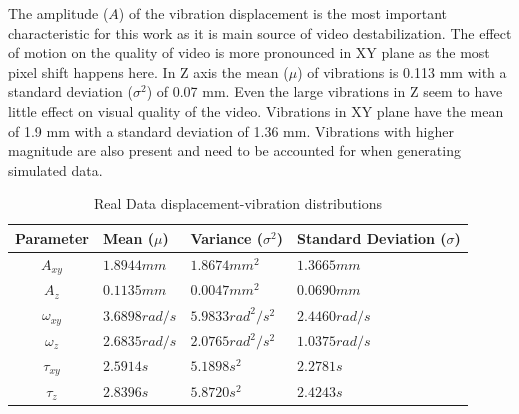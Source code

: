 The amplitude ($ A $) of the vibration displacement is the most important characteristic for this work as it is main source of video destabilization. The effect of motion on the quality of video is more pronounced in XY plane as the most pixel shift happens here. In Z axis the mean ($ \mu $) of vibrations is 0.113 mm with a standard deviation ($ \sigma^{2} $) of 0.07 mm. Even the large vibrations in Z seem to have little effect on visual quality of the video. Vibrations in XY plane have the mean of 1.9 mm with a standard deviation of 1.36 mm. Vibrations with higher magnitude are also present and need to be accounted for when generating simulated data.

\begin{table}[H]
    \centering
\begin{tabular}{ c | L | L | L }
    
     Parameter  & 
     Mean ($ \mu $) & 
     Variance ($ \sigma^{2} $) &
     Standard Deviation ($ \sigma $)\\
     \hline
     
     $ A_{xy} $ & 
     $ 1.8944 mm $ & 
     $ 1.8674 mm^{2} $ &
     $ 1.3665 mm $ \\

      
     $ A_{z} $  & 
     $ 0.1135 mm $ & 
     $ 0.0047 mm^{2} $ &
     $ 0.0690 mm $ \\
     
     
     $ \omega_{xy} $ & 
     $ 3.6898 rad/s $ & 
     $ 5.9833 rad^{2}/s^{2} $ &
     $ 2.4460 rad/s $ \\
     
     
     $ \omega_{z} $& 
     $ 2.6835 rad/s $ & 
     $ 2.0765 rad^{2}/s^{2} $ &
     $ 1.0375 rad/s $ \\

     
     $ \tau_{xy} $ & 
     $ 2.5914 s $ & 
     $ 5.1898 s^{2} $ &
     $ 2.2781 s $ \\


     $ \tau_{z} $ & 
     $ 2.8396 s $ & 
     $ 5.8720 s^{2} $ &
     $ 2.4243 s $ \\

\end{tabular}
    \caption{Real Data displacement-vibration distributions}
    \label{tab:real_data_analysis_displacement}
\end{table}


